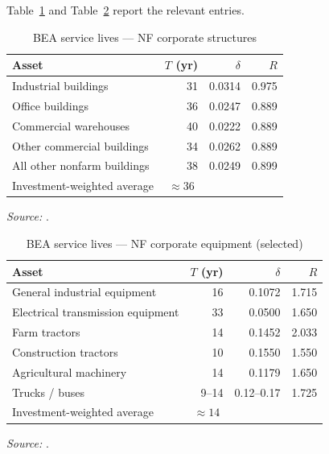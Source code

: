 Table~\ref{tab:ret:fraumeni_structures} and
Table~\ref{tab:ret:fraumeni_equipment} report the relevant entries.

\begin{table}[htbp]
\centering
\caption{BEA service lives --- NF corporate structures}
\label{tab:ret:fraumeni_structures}
\begin{threeparttable}
\begin{tabular}{lrrr}
\toprule
Asset & $T$ (yr) & $\delta$ & $R$ \\
\midrule
Industrial buildings           & 31 & 0.0314 & 0.975 \\
Office buildings               & 36 & 0.0247 & 0.889 \\
Commercial warehouses          & 40 & 0.0222 & 0.889 \\
Other commercial buildings     & 34 & 0.0262 & 0.889 \\
All other nonfarm buildings    & 38 & 0.0249 & 0.899 \\
\midrule
Investment-weighted average    & \multicolumn{1}{c}{$\approx 36$} & & \\
\bottomrule
\end{tabular}
\begin{tablenotes}
\small
\item \textit{Source:} \citet[Table~3]{Fraumeni1997}.
\end{tablenotes}
\end{threeparttable}
\end{table}

\begin{table}[htbp]
\centering
\caption{BEA service lives --- NF corporate equipment (selected)}
\label{tab:ret:fraumeni_equipment}
\begin{threeparttable}
\begin{tabular}{lrrr}
\toprule
Asset & $T$ (yr) & $\delta$ & $R$ \\
\midrule
General industrial equipment        & 16 & 0.1072 & 1.715 \\
Electrical transmission equipment   & 33 & 0.0500 & 1.650 \\
Farm tractors                       & 14 & 0.1452 & 2.033 \\
Construction tractors               & 10 & 0.1550 & 1.550 \\
Agricultural machinery              & 14 & 0.1179 & 1.650 \\
Trucks / buses                      & 9--14 & 0.12--0.17 & 1.725 \\
\midrule
Investment-weighted average         & \multicolumn{1}{c}{$\approx 14$} & & \\
\bottomrule
\end{tabular}
\begin{tablenotes}
\small
\item \textit{Source:} \citet[Table~3]{Fraumeni1997}.
\end{tablenotes}
\end{threeparttable}
\end{table}

